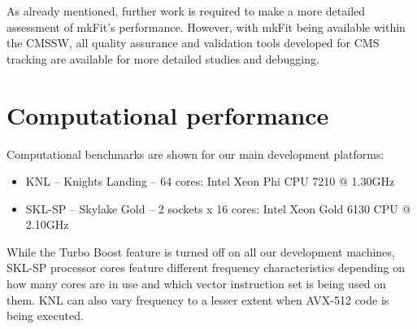 \documentclass{webofc}
\def\mkfit{mkFit\xspace}
\begin{document}

As already mentioned, further work is required to make a more detailed
assessment of \mkfit's performance. However, with \mkfit being available
within the CMSSW, all quality assurance and validation tools developed for CMS
tracking are available for more detailed studies and debugging.



\section{Computational performance}
\label{sec:comp-perf}


Computational benchmarks are shown for our main development platforms:

\begin{itemize}

\item KNL -- Knights Landing -- 64 cores: Intel Xeon Phi CPU 7210 @ 1.30GHz

\item SKL-SP -- Skylake Gold -- 2 sockets x 16 cores: Intel Xeon Gold 6130 CPU @ 2.10GHz

\end{itemize}

While the Turbo Boost feature is turned off on all our development machines,
SKL-SP processor cores feature different frequency characteristics depending
on how many cores are in use and which vector instruction set is being used on
them. KNL can also vary frequency to a lesser extent when AVX-512 code is
being executed.
\end{document}
